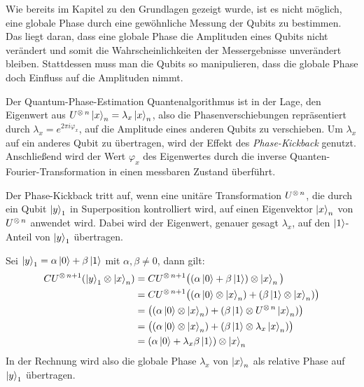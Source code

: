 Wie bereits im Kapitel zu den Grundlagen gezeigt wurde, 
ist es nicht möglich, eine globale Phase durch eine gewöhnliche Messung der Qubits zu bestimmen. 
Das liegt daran, dass eine globale Phase die Amplituden eines Qubits nicht verändert und 
somit die Wahrscheinlichkeiten der Messergebnisse unverändert bleiben. 
Stattdessen muss man die Qubits so manipulieren, 
dass die globale Phase doch Einfluss auf die Amplituden nimmt.

Der Quantum-Phase-Estimation Quantenalgorithmus ist in der Lage, 
den Eigenwert aus \(U^{\operatorname{\otimes} n}\ket{x}_n=\lambda_x\ket{x}_n\), 
also die Phasenverschiebungen repräsentiert durch \(\lambda_x = e^{2\pi i \varphi_x}\),
auf die Amplitude eines anderen Qubits zu verschieben.
Um \(\lambda_x\) auf ein anderes Qubit zu übertragen, 
wird der Effekt des \emph{Phase-Kickback} genutzt.
Anschließend wird der Wert \(\varphi_x\) des Eigenwertes durch die inverse Quanten-Fourier-Transformation in einen messbaren Zustand überführt.

Der Phase-Kickback tritt auf, 
wenn eine unitäre Transformation \(U^{\operatorname{\otimes} n}\), die durch ein Qubit \(\ket{y}_1\) in Superposition kontrolliert wird,
auf einen Eigenvektor \(\ket{x}_n\) von \(U^{\operatorname{\otimes} n}\) anwendet wird.
Dabei wird der Eigenwert, genauer gesagt \(\lambda_x\), 
auf den \(\ket{1}\)-Anteil von \(\ket{y}_1\) übertragen.

Sei \( \ket{y}_1 = \alpha\ket{0} + \beta\ket{1} \) mit \( \alpha,\beta \neq 0 \), dann gilt:
\begin{align*}
  CU^{\operatorname{\otimes} n+1}(\ket{y}_1 \otimes \ket{x}_n) 
  &= CU^{\operatorname{\otimes} n+1}\big((\alpha\ket{0} + \beta\ket{1}) \otimes \ket{x}_n\big) \\
  &= CU^{\operatorname{\otimes} n+1}\big((\alpha\ket{0}\otimes\ket{x}_n) + (\beta\ket{1}\otimes \ket{x}_n)\big) \\
  &= \big((\alpha\ket{0}\otimes\ket{x}_n) + (\beta\ket{1}\otimes U^{\operatorname{\otimes} n}\ket{x}_n)\big) \\
  &= \big((\alpha\ket{0}\otimes\ket{x}_n) + (\beta\ket{1}\otimes \lambda_x\ket{x}_n)\big) \\
  &= (\alpha\ket{0} + \lambda_x\beta\ket{1}) \otimes \ket{x}_n
\end{align*}
In der Rechnung wird also die globale Phase \(\lambda_x\) von \(\ket{x}_n\) als relative Phase auf \(\ket{y}_1\) übertragen.

